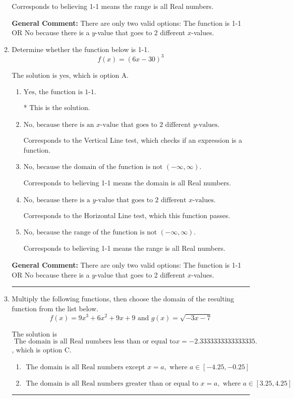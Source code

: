 \documentclass{extbook}[14pt]
\newcommand{\litem}[1]{\item #1

\rule{\textwidth}{0.4pt}}
\begin{document}
\begin{enumerate}
{\begin{enumerate}[label=\Alph*.]
Corresponds to believing 1-1 means the range is all Real numbers.
\end{enumerate}

\textbf{General Comment:} There are only two valid options: The function is 1-1 OR No because there is a $y$-value that goes to 2 different $x$-values.
}
\litem{
Determine whether the function below is 1-1.
\[ f(x) = (6 x - 30)^3 \]

The solution is \( \text{yes} \), which is option A.\begin{enumerate}[label=\Alph*.]
\item \( \text{Yes, the function is 1-1.} \)

* This is the solution.
\item \( \text{No, because there is an $x$-value that goes to 2 different $y$-values.} \)

Corresponds to the Vertical Line test, which checks if an expression is a function.
\item \( \text{No, because the domain of the function is not $(-\infty, \infty)$.} \)

Corresponds to believing 1-1 means the domain is all Real numbers.
\item \( \text{No, because there is a $y$-value that goes to 2 different $x$-values.} \)

Corresponds to the Horizontal Line test, which this function passes.
\item \( \text{No, because the range of the function is not $(-\infty, \infty)$.} \)

Corresponds to believing 1-1 means the range is all Real numbers.
\end{enumerate}

\textbf{General Comment:} There are only two valid options: The function is 1-1 OR No because there is a $y$-value that goes to 2 different $x$-values.
}
\litem{
Multiply the following functions, then choose the domain of the resulting function from the list below.
\[ f(x) = 9x^{3} +6 x^{2} +9 x + 9 \text{ and } g(x) = \sqrt{-3x-7}  \]

The solution is \( \text{ The domain is all Real numbers less than or equal to} x = -2.3333333333333335. \), which is option C.\begin{enumerate}[label=\Alph*.]
\item \( \text{ The domain is all Real numbers except } x = a, \text{ where } a \in [-4.25, -0.25] \)


\item \( \text{ The domain is all Real numbers greater than or equal to } x = a, \text{ where } a \in [3.25, 4.25] \)



\end{enumerate}}
\end{enumerate}
\end{document}
